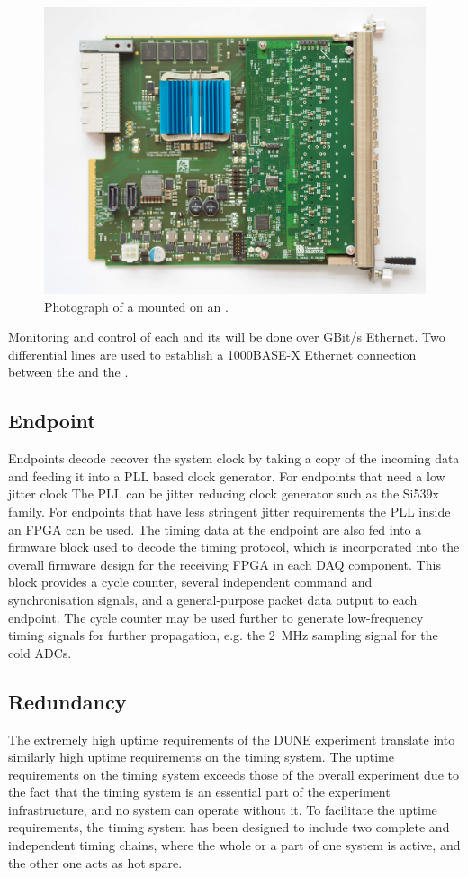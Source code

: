 \documentclass{dune}
\begin{document}
\begin{figure}[h]
\includegraphics[width=\textwidth]{OI000293.jpg}
\caption{Photograph of a  mounted on an .}
\label{fig:fib_afc_photo}
\end{figure}

Monitoring and control of each  and its  will be done over GBit/s Ethernet. Two differential lines are used to establish a 1000BASE-X Ethernet connection between the  and the .

\subsection{Endpoint}
Endpoints decode recover the system clock by taking a copy of the incoming  data and feeding it into a PLL based clock generator. For endpoints that need a low jitter clock The PLL can be jitter reducing clock generator such as the Si539x family. For endpoints that have less stringent jitter requirements the PLL inside an FPGA can be used. The timing data at the endpoint are also fed into a firmware block used to decode the timing protocol, which is incorporated into the overall firmware design for the receiving FPGA in each DAQ component. This block provides a cycle counter, several independent command and synchronisation signals, and a general-purpose packet data output to each endpoint. The cycle counter may be used further to generate low-frequency timing signals for further propagation, e.g. the \SI{2}{\MHz} sampling signal for the cold ADCs.
\subsection{Redundancy}
The extremely high uptime requirements of the DUNE experiment translate into similarly high uptime requirements on the timing system. The uptime requirements on the timing system exceeds those of the overall experiment due to the fact that the timing system is an essential part of the experiment infrastructure, and no system can operate without it. To facilitate the uptime requirements, the timing system has been designed to include two complete and independent timing chains, where the whole or a part of one system is active, and the other one acts as hot spare.
\end{document}
